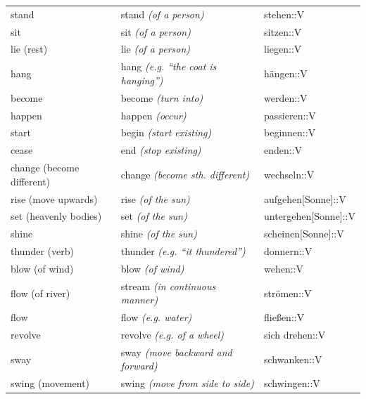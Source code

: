 \begin{center}
\begin{longtable}{lll}
{\sc \lowercase{	STAND	}}	&	stand	\textit{\footnotesize (of a person)}	&	stehen::V	\\
{\sc \lowercase{	SIT	}}	&	sit	\textit{\footnotesize (of a person)}	&	sitzen::V	\\
{\sc \lowercase{	LIE \footnotesize (REST)	}}	&	lie	\textit{\footnotesize (of a person)}	&	liegen::V	\\
{\sc \lowercase{	HANG	}}	&	hang	\textit{\footnotesize (e.g. ``the coat is hanging'')}	&	hängen::V	\\
{\sc \lowercase{	BECOME	}}	&	become	\textit{\footnotesize (turn into)}	&	werden::V	\\
{\sc \lowercase{	HAPPEN	}}	&	happen	\textit{\footnotesize (occur)}	&	passieren::V	\\
{\sc \lowercase{	START	}}	&	begin	\textit{\footnotesize (start existing)}	&	beginnen::V	\\
{\sc \lowercase{	CEASE	}}	&	end	\textit{\footnotesize (stop existing)}	&	enden::V	\\
{\sc \lowercase{	\footnotesize CHANGE \footnotesize (BECOME DIFFERENT)	}}	&	change	\textit{\footnotesize (become sth. different)}	&	wechseln::V	\\
{\sc \lowercase{	RISE \footnotesize (MOVE UPWARDS)	}}	&	rise	\textit{\footnotesize (of the sun)}	&	aufgehen[Sonne]::V	\\
{\sc \lowercase{	SET \footnotesize (HEAVENLY BODIES)	}}	&	set	\textit{\footnotesize (of the sun)}	&	untergehen[Sonne]::V	\\
{\sc \lowercase{	SHINE	}}	&	shine	\textit{\footnotesize (of the sun)}	&	scheinen[Sonne]::V	\\
{\sc \lowercase{	THUNDER \footnotesize (VERB)	}}	&	thunder	\textit{\footnotesize (e.g. ``it thundered'')}	&	donnern::V	\\
{\sc \lowercase{	BLOW \footnotesize (OF WIND)	}}	&	blow	\textit{\footnotesize (of wind)}	&	wehen::V	\\
{\sc \lowercase{	FLOW \footnotesize (OF RIVER)	}}	&	stream	\textit{\footnotesize (in continuous manner)}	&	strömen::V	\\
{\sc \lowercase{	FLOW	}}	&	flow	\textit{\footnotesize (e.g. water)}	&	fließen::V	\\
{\sc \lowercase{	REVOLVE	}}	&	revolve	\textit{\footnotesize (e.g. of a wheel)}	&	sich drehen::V	\\
{\sc \lowercase{	SWAY	}}	&	sway	\textit{\footnotesize (move backward and forward)}	&	schwanken::V	\\
{\sc \lowercase{	SWING \footnotesize (MOVEMENT)	}}	&	swing	\textit{\footnotesize (move from side to side)}	&	schwingen::V	\\

\end{longtable}
\end{center}
